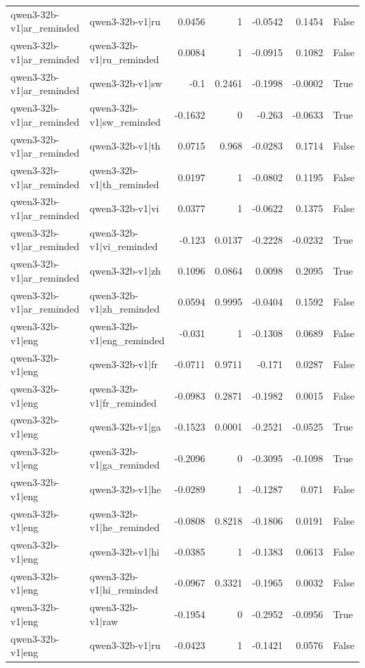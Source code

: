 \begin{table}
\begin{tabular}{l l r r r r l}
qwen3-32b-v1|ar_reminded & qwen3-32b-v1|ru & 0.0456 & 1 & -0.0542 & 0.1454 & False \\
qwen3-32b-v1|ar_reminded & qwen3-32b-v1|ru_reminded & 0.0084 & 1 & -0.0915 & 0.1082 & False \\
qwen3-32b-v1|ar_reminded & qwen3-32b-v1|sw & -0.1 & 0.2461 & -0.1998 & -0.0002 & True \\
qwen3-32b-v1|ar_reminded & qwen3-32b-v1|sw_reminded & -0.1632 & 0 & -0.263 & -0.0633 & True \\
qwen3-32b-v1|ar_reminded & qwen3-32b-v1|th & 0.0715 & 0.968 & -0.0283 & 0.1714 & False \\
qwen3-32b-v1|ar_reminded & qwen3-32b-v1|th_reminded & 0.0197 & 1 & -0.0802 & 0.1195 & False \\
qwen3-32b-v1|ar_reminded & qwen3-32b-v1|vi & 0.0377 & 1 & -0.0622 & 0.1375 & False \\
qwen3-32b-v1|ar_reminded & qwen3-32b-v1|vi_reminded & -0.123 & 0.0137 & -0.2228 & -0.0232 & True \\
qwen3-32b-v1|ar_reminded & qwen3-32b-v1|zh & 0.1096 & 0.0864 & 0.0098 & 0.2095 & True \\
qwen3-32b-v1|ar_reminded & qwen3-32b-v1|zh_reminded & 0.0594 & 0.9995 & -0.0404 & 0.1592 & False \\
qwen3-32b-v1|eng & qwen3-32b-v1|eng_reminded & -0.031 & 1 & -0.1308 & 0.0689 & False \\
qwen3-32b-v1|eng & qwen3-32b-v1|fr & -0.0711 & 0.9711 & -0.171 & 0.0287 & False \\
qwen3-32b-v1|eng & qwen3-32b-v1|fr_reminded & -0.0983 & 0.2871 & -0.1982 & 0.0015 & False \\
qwen3-32b-v1|eng & qwen3-32b-v1|ga & -0.1523 & 0.0001 & -0.2521 & -0.0525 & True \\
qwen3-32b-v1|eng & qwen3-32b-v1|ga_reminded & -0.2096 & 0 & -0.3095 & -0.1098 & True \\
qwen3-32b-v1|eng & qwen3-32b-v1|he & -0.0289 & 1 & -0.1287 & 0.071 & False \\
qwen3-32b-v1|eng & qwen3-32b-v1|he_reminded & -0.0808 & 0.8218 & -0.1806 & 0.0191 & False \\
qwen3-32b-v1|eng & qwen3-32b-v1|hi & -0.0385 & 1 & -0.1383 & 0.0613 & False \\
qwen3-32b-v1|eng & qwen3-32b-v1|hi_reminded & -0.0967 & 0.3321 & -0.1965 & 0.0032 & False \\
qwen3-32b-v1|eng & qwen3-32b-v1|raw & -0.1954 & 0 & -0.2952 & -0.0956 & True \\
qwen3-32b-v1|eng & qwen3-32b-v1|ru & -0.0423 & 1 & -0.1421 & 0.0576 & False \\

\end{tabular}
\end{table}
